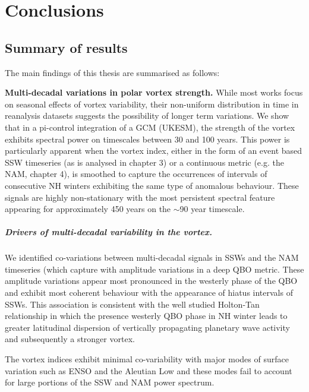 \chapter{Conclusions}
\label{cha:conclusions}

\section{Summary of results}

The main findings of this thesis are summarised as follows: 

\textbf{Multi-decadal variations in polar vortex strength.}
While most works focus on seasonal effects of vortex variability, their non-uniform distribution in time in reanalysis datasets suggests the possibility of longer term variations. We show that in a pi-control integration of a GCM (UKESM), the strength of the vortex exhibits spectral power on timescales between 30 and 100 years. This power is particularly apparent when the vortex index, either in the form of an event based SSW timeseries (as is analysed in chapter 3) or a continuous metric (e.g. the NAM, chapter 4), is smoothed to capture the occurrences of intervals of consecutive NH winters exhibiting the same type of anomalous behaviour. These signals are highly non-stationary with the most persistent spectral feature appearing for approximately 450 years on the $\sim$90 year timescale. 

\paragraph{Drivers of multi-decadal variability in the vortex.}
We identified co-variations between multi-decadal signals in SSWs and the NAM timeseries (which capture with amplitude variations in a deep QBO metric. These amplitude variations appear most pronounced in the westerly phase of the QBO and exhibit most coherent behaviour with the appearance of hiatus intervals of SSWs. This association is consistent with the well studied Holton-Tan relationship in which the presence westerly QBO phase in NH winter leads to greater latitudinal dispersion of vertically propagating planetary wave activity and subsequently a stronger vortex.  

The vortex indices exhibit minimal co-variability with major modes of surface variation such as ENSO and the Aleutian Low and these modes fail to account for large portions of the SSW and NAM power spectrum.



